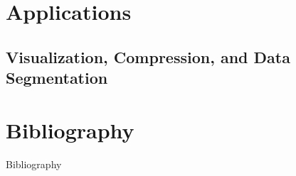 \section{Applications}
\subsection{Visualization, Compression, and Data Segmentation}
\begin{frame}
\end{frame}

\section*{Bibliography}
\begin{frame}{Bibliography}
	\nocite{wagner}
	\nocite{hatcher}
	\nocite{fraleigha}
	\begingroup
	\renewcommand{\section}[2]{}%
	
	\endgroup
\end{frame}





